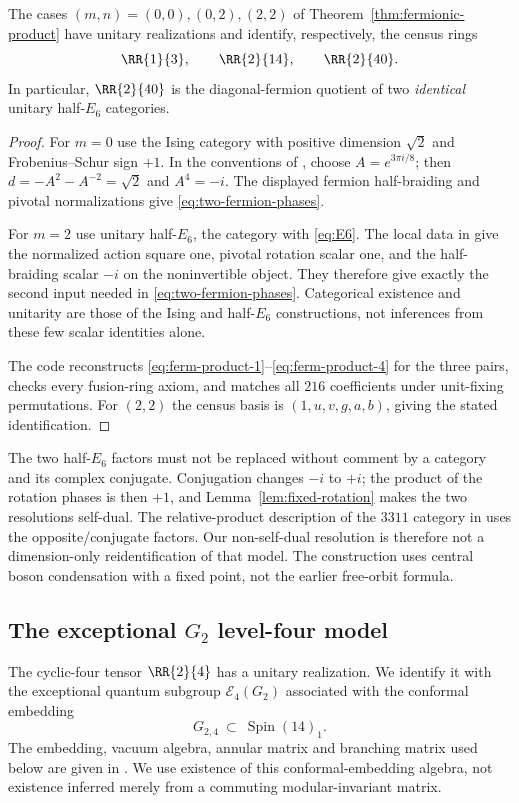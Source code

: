 \begin{corollary}\label{cor:fermionic-models}
The cases $(m,n)=(0,0),(0,2),(2,2)$ of
Theorem~\ref{thm:fermionic-product} have unitary realizations and identify,
respectively, the census rings
\[
 \RR{1}{3},\qquad \RR{2}{14},\qquad \RR{2}{40}.
\]
In particular, $\RR{2}{40}$ is the diagonal-fermion quotient of two
\emph{identical} unitary half-$E_6$ categories.
\end{corollary}
\begin{proof}
For $m=0$ use the Ising category with positive dimension $\sqrt2$ and
Frobenius--Schur sign $+1$. In the conventions of
\cite[Section~2.1, equations~(9)--(13)]{ALW}, choose $A=e^{3\pi i/8}$;
then $d=-A^2-A^{-2}=\sqrt2$ and $A^4=-i$. The displayed fermion
half-braiding and pivotal normalizations give
\eqref{eq:two-fermion-phases}.

For $m=2$ use unitary half-$E_6$, the category with
\eqref{eq:E6}. The local data in
\cite[Section~7.1, equation~(235), Section~7.2, equation~(240),
Appendix~D.1, equation~(467)]{ALW} give the normalized action square one,
pivotal rotation scalar one, and the half-braiding scalar $-i$ on the
noninvertible object. They therefore give exactly the second input
needed in \eqref{eq:two-fermion-phases}. Categorical existence and
unitarity are those of the Ising and half-$E_6$ constructions, not
inferences from these few scalar identities alone.

The code reconstructs \eqref{eq:ferm-product-1}--\eqref{eq:ferm-product-4}
for the three pairs, checks every fusion-ring axiom, and matches all
$216$ coefficients under unit-fixing permutations. For $(2,2)$ the
census basis is $(1,u,v,g,a,b)$, giving the stated identification.
\end{proof}

The two half-$E_6$ factors must not be replaced without comment by a
category and its complex conjugate. Conjugation changes $-i$ to $+i$;
the product of the rotation phases is then $+1$, and
Lemma~\ref{lem:fixed-rotation} makes the two resolutions self-dual.
The relative-product description of the $3311$ category in
\cite[Section~5.1]{IJMS} uses the opposite/conjugate factors.
Our non-self-dual resolution is therefore not a dimension-only
reidentification of that model. The construction uses central boson
condensation with a fixed point, not the earlier free-orbit formula.

\subsection{The exceptional $G_2$ level-four model}\label{sec:g2-e4}
The cyclic-four tensor $\RR{2}{4}$ has a unitary realization.
We identify it with the exceptional
quantum subgroup $\mathcal E_4(G_2)$ associated with the conformal
embedding
\begin{equation}\label{eq:g2-embedding}
 G_{2,4}\ \subset\ \operatorname{Spin}(14)_1.
\end{equation}
The embedding, vacuum algebra, annular matrix and branching matrix
used below are given in \cite[Section~4.5, pp.~29--32]{CRT}. We use
existence of this conformal-embedding algebra, not existence inferred
merely from a commuting modular-invariant matrix.

